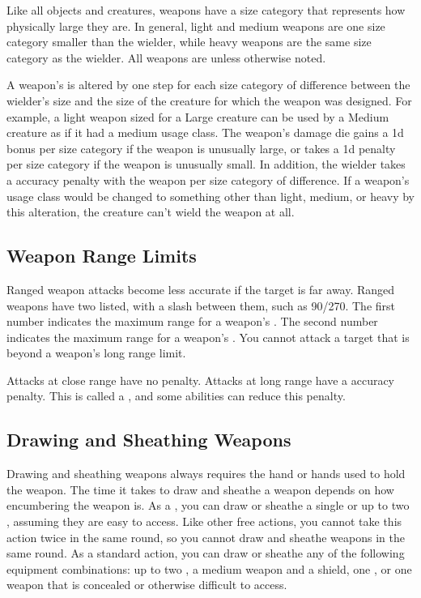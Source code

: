          Like all objects and creatures, weapons have a size category that represents how physically large they are. In general, light and medium weapons are one size category smaller than the wielder, while heavy weapons are the same size category as the wielder.
        All weapons are  unless otherwise noted.

        \label{Inappropriately Sized Weapons} A weapon's  is altered by one step for each size category of difference between the wielder's size and the size of the creature for which the weapon was designed.
        For example, a light weapon sized for a Large creature can be used by a Medium creature as if it had a medium usage class.
        The weapon's damage die gains a \plus1d bonus per size category if the weapon is unusually large, or takes a \minus1d penalty per size category if the weapon is unusually small.
        In addition, the wielder takes a  accuracy penalty with the weapon per size category of difference.
        If a weapon's usage class would be changed to something other than light, medium, or heavy by this alteration, the creature can't wield the weapon at all.

    \subsection{Weapon Range Limits}\label{Weapon Range Limits}
        Ranged weapon attacks become less accurate if the target is far away.
        Ranged weapons have two  listed, with a slash between them, such as 90/270.
        The first number indicates the maximum range for a weapon's .
        The second number indicates the maximum range for a weapon's .
        You cannot attack a target that is beyond a weapon's long range limit.

        Attacks at close range have no penalty.
        Attacks at long range have a  accuracy penalty.
        This is called a , and some abilities can reduce this penalty.

    \subsection{Drawing and Sheathing Weapons}\label{Drawing and Sheathing Weapons}
        Drawing and sheathing weapons always requires the hand or hands used to hold the weapon.
        The time it takes to draw and sheathe a weapon depends on how encumbering the weapon is.
        As a , you can draw or sheathe a single  or up to two , assuming they are easy to access.
        Like other free actions, you cannot take this action twice in the same round, so you cannot draw and sheathe weapons in the same round.
        As a standard action, you can draw or sheathe any of the following equipment combinations: up to two , a medium weapon and a shield, one , or one weapon that is concealed or otherwise difficult to access.


